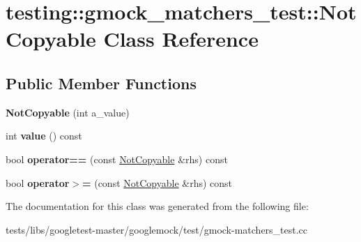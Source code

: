 \hypertarget{classtesting_1_1gmock__matchers__test_1_1NotCopyable}{}\section{testing\+:\+:gmock\+\_\+matchers\+\_\+test\+:\+:Not\+Copyable Class Reference}
\label{classtesting_1_1gmock__matchers__test_1_1NotCopyable}
\subsection*{Public Member Functions}
\begin{DoxyCompactItemize}
\item 
\mbox{\label{classtesting_1_1gmock__matchers__test_1_1NotCopyable_a3d15763c115415a26d8acc9ce5a26e19}} 
{\bfseries Not\+Copyable} (int a\+\_\+value)
\item 
\mbox{\label{classtesting_1_1gmock__matchers__test_1_1NotCopyable_af6c134767462948fa8dbd35c68370004}} 
int {\bfseries value} () const
\item 
\mbox{\label{classtesting_1_1gmock__matchers__test_1_1NotCopyable_a2e68fcd9a588a184d54e6b54e41fb978}} 
bool {\bfseries operator==} (const \hyperlink{classtesting_1_1gmock__matchers__test_1_1NotCopyable}{Not\+Copyable} \&rhs) const
\item 
\mbox{\label{classtesting_1_1gmock__matchers__test_1_1NotCopyable_a36eb6a25f5559bee00fe52a6d86b42d6}} 
bool {\bfseries operator$>$=} (const \hyperlink{classtesting_1_1gmock__matchers__test_1_1NotCopyable}{Not\+Copyable} \&rhs) const
\end{DoxyCompactItemize}


The documentation for this class was generated from the following file\+:\begin{DoxyCompactItemize}
\item 
tests/libs/googletest-\/master/googlemock/test/gmock-\/matchers\+\_\+test.\+cc\end{DoxyCompactItemize}
